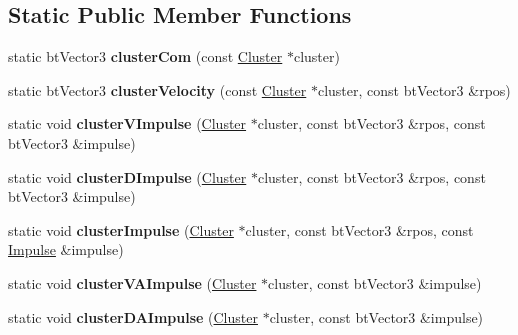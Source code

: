 \subsection*{Static Public Member Functions}
\begin{DoxyCompactItemize}
\item 
\mbox{\label{classbtSoftBody_a8a4ea1cf74b8b8e08733d3f0fb466ded}} 
static bt\+Vector3 {\bfseries cluster\+Com} (const \hyperlink{structbtSoftBody_1_1Cluster}{Cluster} $\ast$cluster)
\item 
\mbox{\label{classbtSoftBody_ab6ae110bfb643bda929c67a59cf6b83f}} 
static bt\+Vector3 {\bfseries cluster\+Velocity} (const \hyperlink{structbtSoftBody_1_1Cluster}{Cluster} $\ast$cluster, const bt\+Vector3 \&rpos)
\item 
\mbox{\label{classbtSoftBody_a546e7f4e94c6b75f7e4eecada5b956e7}} 
static void {\bfseries cluster\+V\+Impulse} (\hyperlink{structbtSoftBody_1_1Cluster}{Cluster} $\ast$cluster, const bt\+Vector3 \&rpos, const bt\+Vector3 \&impulse)
\item 
\mbox{\label{classbtSoftBody_ab3cfd805f7fddd63db5f966c3d1cbb1b}} 
static void {\bfseries cluster\+D\+Impulse} (\hyperlink{structbtSoftBody_1_1Cluster}{Cluster} $\ast$cluster, const bt\+Vector3 \&rpos, const bt\+Vector3 \&impulse)
\item 
\mbox{\label{classbtSoftBody_aad6406f1e55d95ba092ed2f51a992b72}} 
static void {\bfseries cluster\+Impulse} (\hyperlink{structbtSoftBody_1_1Cluster}{Cluster} $\ast$cluster, const bt\+Vector3 \&rpos, const \hyperlink{structbtSoftBody_1_1Impulse}{Impulse} \&impulse)
\item 
\mbox{\label{classbtSoftBody_a7bfd5a6382e9f1d35ff2b6a2e90d2fbc}} 
static void {\bfseries cluster\+V\+A\+Impulse} (\hyperlink{structbtSoftBody_1_1Cluster}{Cluster} $\ast$cluster, const bt\+Vector3 \&impulse)
\item 
\mbox{\label{classbtSoftBody_a6222d3a234f2776c398084a673f6a35f}} 
static void {\bfseries cluster\+D\+A\+Impulse} (\hyperlink{structbtSoftBody_1_1Cluster}{Cluster} $\ast$cluster, const bt\+Vector3 \&impulse)
\item 

\end{DoxyCompactItemize}
